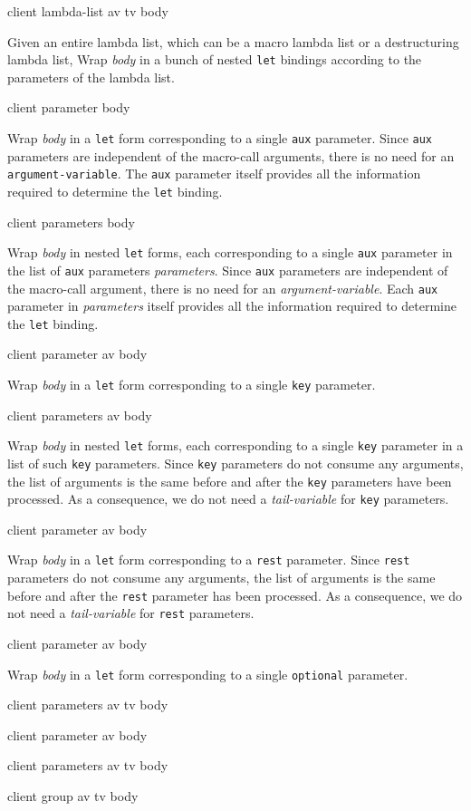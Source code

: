  {client lambda-list av tv body}

Given an entire lambda list, which can be a macro lambda list or a
destructuring lambda list, Wrap \textit{body} in a bunch of nested
\texttt{let} bindings according to the parameters of the lambda list.

 {client parameter body}

Wrap \textit{body} in a \texttt{let} form corresponding to a single
\texttt{aux} parameter.  Since \texttt{aux} parameters are independent
of the macro-call arguments, there is no need for an
\texttt{argument-variable}.  The \texttt{aux} parameter itself
provides all the information required to determine the \texttt{let}
binding.

 {client parameters body}

Wrap \textit{body} in nested \texttt{let} forms, each corresponding to
a single \texttt{aux} parameter in the list of \texttt{aux} parameters
\textit{parameters}.  Since \texttt{aux} parameters are independent of
the macro-call argument, there is no need for an
\textit{argument-variable}.  Each \texttt{aux} parameter in
\textit{parameters} itself provides all the information required to
determine the \texttt{let} binding.

 {client parameter av body}

Wrap \textit{body} in a \texttt{let} form corresponding to a single
\texttt{key} parameter.

 {client parameters av body}

Wrap \textit{body} in nested \texttt{let} forms, each corresponding to
a single \texttt{key} parameter in a list of such \texttt{key}
parameters.  Since \texttt{key} parameters do not consume any
arguments, the list of arguments is the same before and after the
\texttt{key} parameters have been processed.  As a consequence, we do
not need a \textit{tail-variable} for \texttt{key} parameters.

 {client parameter av body}

Wrap \textit{body} in a \texttt{let} form corresponding to a
\texttt{rest} parameter.  Since \texttt{rest} parameters do not
consume any arguments, the list of arguments is the same before and
after the \texttt{rest} parameter has been processed.  As a
consequence, we do not need a \textit{tail-variable} for \texttt{rest}
parameters.

 {client parameter av body}

Wrap \textit{body} in a \texttt{let} form corresponding to a single
\texttt{optional} parameter.

 {client parameters av tv body}

 {client parameter av body}

 {client parameters av tv body}

 {client group av tv body}

